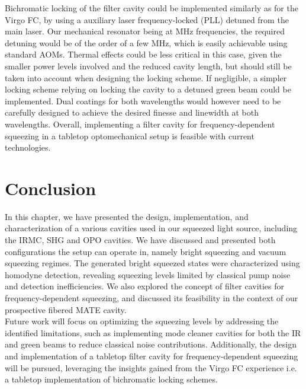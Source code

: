 Bichromatic locking of the filter cavity could be implemented similarly as for the Virgo FC, by using a auxiliary laser frequency-locked (PLL) detuned from the main laser. Our mechanical resonator being at MHz frequencies, the required detuning would be of the order of a few MHz, which is easily achievable using standard AOMs. Thermal effects could be less critical in this case, given the smaller power levels involved and the reduced cavity length, but should still be taken into account when designing the locking scheme. If negligible, a simpler locking scheme relying on locking the cavity to a detuned green beam could be implemented. Dual coatings for both wavelengths would however need to be carefully designed to achieve the desired finesse and linewidth at both wavelengths. Overall, implementing a filter cavity for frequency-dependent squeezing in a tabletop optomechanical setup is feasible with current technologies. 

\section{Conclusion}
In this chapter, we have presented the design, implementation, and characterization of a various cavities used in our squeezed light source, including the IRMC, SHG and OPO cavities. We have discussed and presented both configurations the setup can operate in, namely bright squeezing and vacuum squeezing regimes. The generated bright squeezed states were characterized using homodyne detection, revealing squeezing levels limited by classical pump noise and detection inefficiencies. We also explored the concept of filter cavities for frequency-dependent squeezing, and discussed its feasibility in the context of our prospective fibered MATE cavity. \\ 

Future work will focus on optimizing the squeezing levels by addressing the identified limitations, such as implementing mode cleaner cavities for both the IR and green beams to reduce classical noise contributions. Additionally, the design and implementation of a tabletop filter cavity for frequency-dependent squeezing will be pursued, leveraging the insights gained from the Virgo FC experience i.e. a tabletop implementation of bichromatic locking schemes. 


